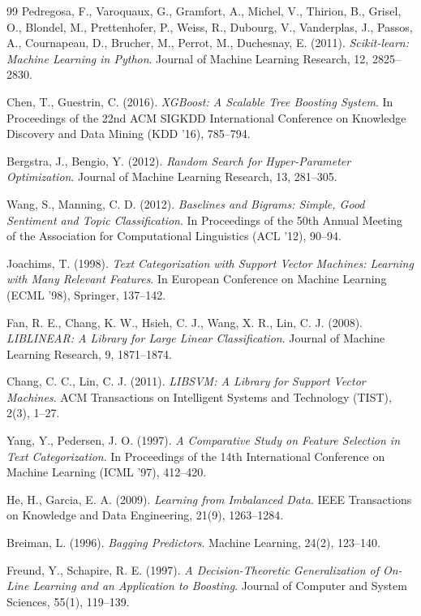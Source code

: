 \begin{thebibliography}{99}
Pedregosa, F., Varoquaux, G., Gramfort, A., Michel, V., Thirion, B., Grisel, O., Blondel, M., Prettenhofer, P., Weiss, R., Dubourg, V., Vanderplas, J., Passos, A., Cournapeau, D., Brucher, M., Perrot, M., Duchesnay, E. (2011). \textit{Scikit-learn: Machine Learning in Python}. Journal of Machine Learning Research, 12, 2825--2830.

Chen, T., Guestrin, C. (2016). \textit{XGBoost: A Scalable Tree Boosting System}. In Proceedings of the 22nd ACM SIGKDD International Conference on Knowledge Discovery and Data Mining (KDD '16), 785--794.

Bergstra, J., Bengio, Y. (2012). \textit{Random Search for Hyper-Parameter Optimization}. Journal of Machine Learning Research, 13, 281--305.

Wang, S., Manning, C. D. (2012). \textit{Baselines and Bigrams: Simple, Good Sentiment and Topic Classification}. In Proceedings of the 50th Annual Meeting of the Association for Computational Linguistics (ACL '12), 90--94.

Joachims, T. (1998). \textit{Text Categorization with Support Vector Machines: Learning with Many Relevant Features}. In European Conference on Machine Learning (ECML '98), Springer, 137--142.

Fan, R. E., Chang, K. W., Hsieh, C. J., Wang, X. R., Lin, C. J. (2008). \textit{LIBLINEAR: A Library for Large Linear Classification}. Journal of Machine Learning Research, 9, 1871--1874.

Chang, C. C., Lin, C. J. (2011). \textit{LIBSVM: A Library for Support Vector Machines}. ACM Transactions on Intelligent Systems and Technology (TIST), 2(3), 1--27.

Yang, Y., Pedersen, J. O. (1997). \textit{A Comparative Study on Feature Selection in Text Categorization}. In Proceedings of the 14th International Conference on Machine Learning (ICML '97), 412--420.

He, H., Garcia, E. A. (2009). \textit{Learning from Imbalanced Data}. IEEE Transactions on Knowledge and Data Engineering, 21(9), 1263--1284.

Breiman, L. (1996). \textit{Bagging Predictors}. Machine Learning, 24(2), 123--140.

Freund, Y., Schapire, R. E. (1997). \textit{A Decision-Theoretic Generalization of On-Line Learning and an Application to Boosting}. Journal of Computer and System Sciences, 55(1), 119--139.


\end{thebibliography}
